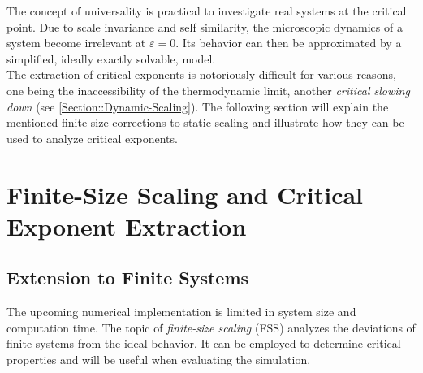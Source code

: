 	The concept of universality is practical to investigate real systems at the critical point. Due to scale invariance and self similarity, the microscopic dynamics of a system become irrelevant at $\varepsilon =	0$. Its behavior can then be approximated by a simplified, ideally exactly solvable, model. \\
	
	The extraction of critical exponents is notoriously difficult for various reasons, one being the inaccessibility of the thermodynamic limit, another \textit{critical slowing down} (see \autoref{Section::Dynamic-Scaling}). The following section will explain the mentioned finite-size corrections to static scaling and illustrate how they can be used to analyze critical exponents.
	\section{Finite-Size Scaling and Critical Exponent Extraction} \label{Section::FSS}
	\subsection{Extension to Finite Systems}
	The upcoming numerical implementation is limited in system size and computation time. The topic of \textit{finite-size scaling }(FSS) analyzes the deviations of finite systems from the ideal behavior. It can be employed to determine critical properties and will be useful when evaluating the simulation. \\
	
